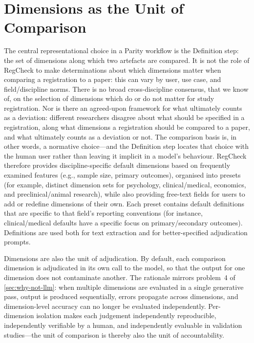 \documentclass{article}
\begin{document}
\section{Dimensions as the Unit of Comparison}\label{sec:dimensions}

The central representational choice in a Parity workflow is the Definition
step: the set of dimensions along which two artefacts are compared. It is not
the role of RegCheck to make determinations about which dimensions matter when
comparing a registration to a paper: this can vary by user, use case, and
field/discipline norms. There is no broad cross-discipline consensus, that we
know of, on the selection of dimensions which do or do not matter for study
registration. Nor is there an agreed-upon framework for what ultimately counts
as a deviation: different researchers disagree about what should be specified in
a registration, along what dimensions a registration should be compared to a
paper, and what ultimately counts as a deviation or not. The comparison basis
is, in other words, a normative choice---and the Definition step locates that
choice with the human user rather than leaving it implicit in a model's
behaviour. RegCheck therefore provides discipline-specific default dimensions
based on frequently examined features (e.g., sample size, primary outcomes),
organised into presets (for example, distinct dimension sets for psychology,
clinical/medical, economics, and preclinical/animal research), while also
providing free-text fields for users to add or redefine dimensions of their own.
Each preset contains default definitions that are specific to that field's
reporting conventions (for instance, clinical/medical defaults have a specific
focus on primary/secondary outcomes). Definitions are used both for text
extraction and for better-specified adjudication prompts.

Dimensions are also the unit of adjudication. By default, each comparison
dimension is adjudicated in its own call to the model, so that the output for
one dimension does not contaminate another. The rationale mirrors problem~4 of
\cref{sec:why-not-llm}: when multiple dimensions are evaluated in a single
generative pass, output is produced sequentially, errors propagate across
dimensions, and dimension-level accuracy can no longer be evaluated
independently. Per-dimension isolation makes each judgement independently
reproducible, independently verifiable by a human, and independently evaluable
in validation studies---the unit of comparison is thereby also the unit of
accountability.
\end{document}
